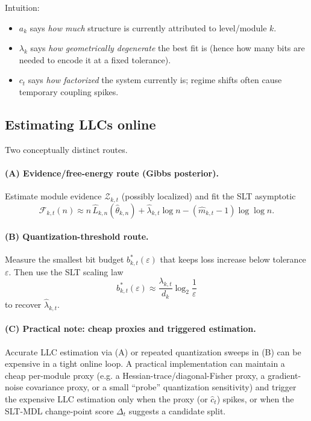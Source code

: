 \documentclass[11pt]{article}
\newcommand{\Zev}{\mathcal{Z}}  %
\newcommand{\Ffree}{\mathcal{F}}%
\begin{document}
Intuition:
\begin{itemize}
  \item $a_k$ says \emph{how much} structure is currently attributed to level/module $k$.
  \item $\lambda_k$ says \emph{how geometrically degenerate} the best fit is (hence how many bits are needed
        to encode it at a fixed tolerance).
  \item $c_t$ says \emph{how factorized} the system currently is; regime shifts often cause temporary coupling spikes.
\end{itemize}

\subsection{Estimating LLCs online}
Two conceptually distinct routes.

\paragraph{(A) Evidence/free-energy route (Gibbs posterior).}
Estimate module evidence $\Zev_{k,t}$ (possibly localized) and fit the SLT asymptotic
\[
\Ffree_{k,t}(n) \approx n\,\hat L_{k,n}(\hat\theta_{k,n}) + \hat\lambda_{k,t}\log n - (\hat m_{k,t}-1)\log\log n.
\]

\paragraph{(B) Quantization-threshold route.}
Measure the smallest bit budget $b^\ast_{k,t}(\varepsilon)$ that keeps loss increase below tolerance $\varepsilon$.
Then use the SLT scaling law
\[
b_{k,t}^\ast(\varepsilon) \approx \frac{\lambda_{k,t}}{d_k}\log_2\!\frac{1}{\varepsilon}
\]
to recover $\hat\lambda_{k,t}$.

\paragraph{(C) Practical note: cheap proxies and triggered estimation.}
Accurate LLC estimation via (A) or repeated quantization sweeps in (B) can be expensive in a tight online loop.
A practical implementation can maintain a cheap per-module proxy (e.g. a Hessian-trace/diagonal-Fisher proxy,
a gradient-noise covariance proxy, or a small ``probe'' quantization sensitivity) and trigger the expensive LLC
estimation only when the proxy (or $\hat c_t$) spikes, or when the SLT-MDL change-point score $\Delta_t$
suggests a candidate split.
\end{document}
